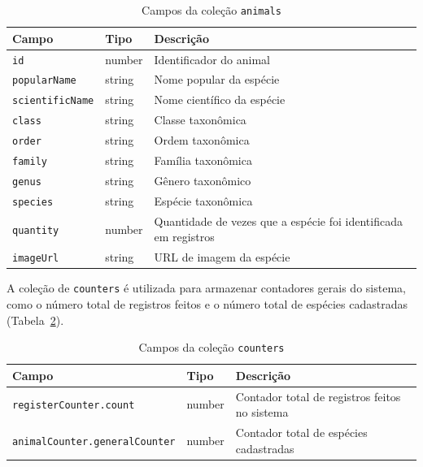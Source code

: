 \begin{table}[H]
    \centering
    \caption{Campos da coleção \texttt{animals}}
    \label{tab:firestore-animals}
    \begin{tabular}{|>{\raggedright\arraybackslash}p{3.5cm}|
                    >{\raggedright\arraybackslash}p{2cm}|
                    >{\raggedright\arraybackslash}p{7cm}|}
        \hline
        \textbf{Campo} & \textbf{Tipo} & \textbf{Descrição} \\ \hline
        \texttt{id} & number & Identificador do animal \\ \hline
        \texttt{popularName} & string & Nome popular da espécie \\ \hline
        \texttt{scientificName} & string & Nome científico da espécie \\ \hline
        \texttt{class} & string & Classe taxonômica \\ \hline
        \texttt{order} & string & Ordem taxonômica \\ \hline
        \texttt{family} & string & Família taxonômica \\ \hline
        \texttt{genus} & string & Gênero taxonômico \\ \hline
        \texttt{species} & string & Espécie taxonômica \\ \hline
        \texttt{quantity} & number & Quantidade de vezes que a espécie foi identificada em registros \\ \hline
        \texttt{imageUrl} & string & URL de imagem da espécie \\ \hline
    \end{tabular}
\end{table}

A coleção de \texttt{counters} é utilizada para armazenar contadores gerais do sistema, como o número total de registros feitos e o número total de espécies cadastradas (Tabela~\ref{tab:firestore-counters}).

\begin{table}[H]
    \centering
    \caption{Campos da coleção \texttt{counters}}
    \label{tab:firestore-counters}
    \begin{tabular}{|>{\raggedright\arraybackslash}p{6cm}|
                    >{\raggedright\arraybackslash}p{2cm}|
                    >{\raggedright\arraybackslash}p{5cm}|}
        \hline
        \textbf{Campo} & \textbf{Tipo} & \textbf{Descrição} \\ \hline
        \texttt{registerCounter.count} & number & Contador total de registros feitos no sistema \\ \hline
        \texttt{animalCounter.generalCounter} & number & Contador total de espécies cadastradas \\ \hline
    \end{tabular}

\end{table}

